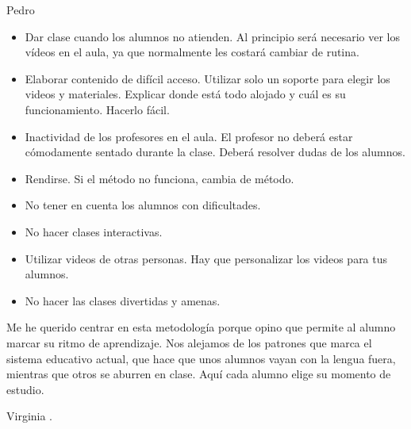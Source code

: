 \begin{opin}{\pedrocolor}{Pedro}
\begin{itemize}
\item Dar clase cuando los alumnos no atienden. Al principio será necesario ver los vídeos en el aula, ya que normalmente les costará cambiar de rutina. 

\item Elaborar contenido de difícil acceso. Utilizar solo un soporte para elegir los videos y materiales. Explicar donde está todo alojado y cuál es su funcionamiento. Hacerlo fácil. 

\item Inactividad de los profesores en el aula. El profesor no deberá estar cómodamente sentado durante la clase. Deberá resolver dudas de los alumnos. 

\item Rendirse. Si el método no funciona, cambia de método. 

\item No tener en cuenta los alumnos con dificultades. 

\item No hacer clases interactivas. 

\item Utilizar videos de otras personas. Hay que personalizar los videos para tus alumnos. 

\item No hacer las clases divertidas y amenas. 
\end{itemize}
Me he querido centrar en esta metodología porque opino que permite al alumno marcar su ritmo de aprendizaje. Nos alejamos de los patrones que marca el sistema educativo actual, que hace que unos alumnos vayan con la lengua fuera, mientras que otros se aburren en clase. Aquí cada alumno elige su momento de estudio.




\end{opin}

\begin{opin}{\virgicolor}{Virginia}
.


\end{opin}
